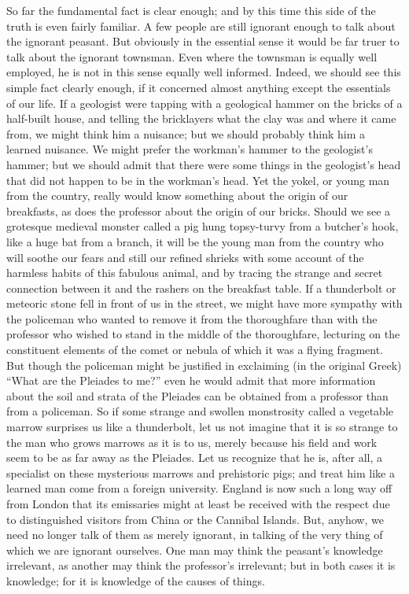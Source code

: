 \documentclass{book}
\begin{document}
So far the fundamental fact is clear enough; and by this time this side of the truth is even fairly familiar. A few people are still ignorant enough to talk about the ignorant peasant. But obviously in the essential sense it would be far truer to talk about the ignorant townsman. Even where the townsman is equally well employed, he is not in this sense equally well informed. Indeed, we should see this simple fact clearly enough, if it concerned almost anything except the essentials of our life. If a geologist were tapping with a geological hammer on the bricks of a half-built house, and telling the bricklayers what the clay was and where it came from, we might think him a nuisance; but we should probably think him a learned nuisance. We might prefer the workman’s hammer to the geologist’s hammer; but we should admit that there were some things in the geologist’s head that did not happen to be in the workman’s head. Yet the yokel, or young man from the country, really would know something about the origin of our breakfasts, as does the professor about the origin of our bricks. Should we see a grotesque medieval monster called a pig hung topsy-turvy from a butcher’s hook, like a huge bat from a branch, it will be the young man from the country who will soothe our fears and still our refined shrieks with some account of the harmless habits of this fabulous animal, and by tracing the strange and secret connection between it and the rashers on the breakfast table. If a thunderbolt or meteoric stone fell in front of us in the street, we might have more sympathy with the policeman who wanted to remove it from the thoroughfare than with the professor who wished to stand in the middle of the thoroughfare, lecturing on the constituent elements of the comet or nebula of which it was a flying fragment. But though the policeman might be justified in exclaiming (in the original Greek) “What are the Pleiades to me?” even he would admit that more information about the soil and strata of the Pleiades can be obtained from a professor than from a policeman. So if some strange and swollen monstrosity called a vegetable marrow surprises us like a thunderbolt, let us not imagine that it is so strange to the man who grows marrows as it is to us, merely because his field and work seem to be as far away as the Pleiades. Let us recognize that he is, after all, a specialist on these mysterious marrows and prehistoric pigs; and treat him like a learned man come from a foreign university. England is now such a long way off from London that its emissaries might at least be received with the respect due to distinguished visitors from China or the Cannibal Islands. But, anyhow, we need no longer talk of them as merely ignorant, in talking of the very thing of which we are ignorant ourselves. One man may think the peasant’s knowledge irrelevant, as another may think the professor’s irrelevant; but in both cases it is knowledge; for it is knowledge of the causes of things.
\end{document}
